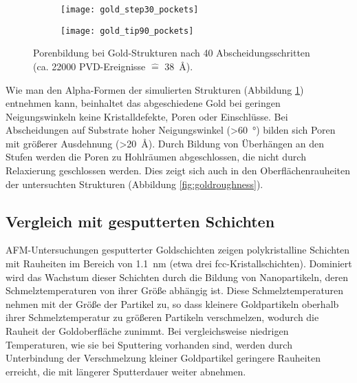 \begin{figure}
  \captionsetup[subfigure]{singlelinecheck=false}
  \def\subfigwidth{0.49\textwidth}

  \begin{subfigure}[t]{\subfigwidth}
    \texttt{[image: gold\_step30\_pockets]}
    \label{fig:goldpockets-a}
  \end{subfigure}
  \hfill
  \begin{subfigure}[t]{\subfigwidth}
    \texttt{[image: gold\_tip90\_pockets]}
    \label{fig:goldpockets-b}
  \end{subfigure}

  \caption[Porenbildung bei Gold-Strukturen]{Porenbildung bei Gold-Strukturen nach 40 Abscheidungsschritten (ca. \num{22000} PVD-Ereignisse $\hat{=}$ \SI{38}{\angstrom}).
  }
  \label{fig:goldpockets}
\end{figure}

Wie man den Alpha-Formen der simulierten Strukturen (Abbildung \ref{fig:goldpockets-a}) entnehmen kann, beinhaltet das abgeschiedene Gold bei geringen Neigungswinkeln keine Kristalldefekte, Poren oder Einschlüsse.
Bei Abscheidungen auf Substrate hoher Neigungswinkel (>\SI{60}{\degree}) bilden sich Poren mit größerer Ausdehnung (>\SI{20}{\angstrom}).
Durch Bildung von Überhängen an den Stufen werden die Poren zu Hohlräumen abgeschlossen, die nicht durch Relaxierung geschlossen werden.
Dies zeigt sich auch in den Oberflächenrauheiten der untersuchten Strukturen (Abbildung \ref{fig:goldroughness}).

\subsection{Vergleich mit gesputterten Schichten}

AFM-Untersuchungen gesputterter Goldschichten zeigen polykristalline Schichten mit Rauheiten im Bereich von \SI{1.1}{\nano\meter}\cite{svorcik_annealing_2011} (etwa drei fcc-Kristallschichten).
Dominiert wird das Wachstum dieser Schichten durch die Bildung von Nanopartikeln, deren Schmelztemperaturen von ihrer Größe abhängig ist.
Diese Schmelztemperaturen nehmen mit der Größe der Partikel zu\cite{liu_melting_2001}, so dass kleinere Goldpartikeln oberhalb ihrer Schmelztemperatur zu größeren Partikeln verschmelzen, wodurch die Rauheit der Goldoberfläche zunimmt.
Bei vergleichsweise niedrigen Temperaturen, wie sie bei Sputtering vorhanden sind, werden durch Unterbindung der Verschmelzung kleiner Goldpartikel geringere Rauheiten erreicht, die mit längerer Sputterdauer weiter abnehmen\cite{svorcik_annealing_2011}.

